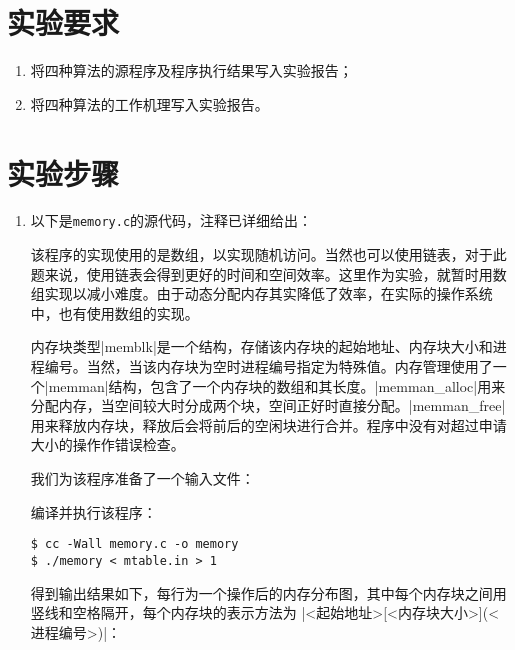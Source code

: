 \documentclass[c5size,a4paper,nofonts]{ctexart}
\begin{document}
\section{实验要求}
\begin{enumerate}[label={(\arabic*)}]
\item 将四种算法的源程序及程序执行结果写入实验报告；
\item 将四种算法的工作机理写入实验报告。
\end{enumerate}

\fi

\section{实验步骤}

\begin{enumerate}

\item 以下是{\tt memory.c}的源代码，注释已详细给出：

{\small\linespread{1}}

该程序的实现使用的是数组，以实现随机访问。当然也可以使用链表，对于此题来说，使用链表会得到更好的时间和空间效率。这里作为实验，就暂时用数组实现以减小难度。由于动态分配内存其实降低了效率，在实际的操作系统中，也有使用数组的实现。

内存块类型|memblk|是一个结构，存储该内存块的起始地址、内存块大小和进程编号。当然，当该内存块为空时进程编号指定为特殊值。内存管理使用了一个|memman|结构，包含了一个内存块的数组和其长度。|memman_alloc|用来分配内存，当空间较大时分成两个块，空间正好时直接分配。|memman_free|用来释放内存块，释放后会将前后的空闲块进行合并。程序中没有对超过申请大小的操作作错误检查。

\vspace*{1em}

我们为该程序准备了一个输入文件：


编译并执行该程序：

\begin{Verbatim}[frame=single]
$ cc -Wall memory.c -o memory
$ ./memory < mtable.in > 1
\end{Verbatim}

\newpage

得到输出结果如下，每行为一个操作后的内存分布图，其中每个内存块之间用竖线和空格隔开，每个内存块的表示方法为 |<起始地址>[<内存块大小>](<进程编号>)|：


\end{enumerate}
\end{document}
